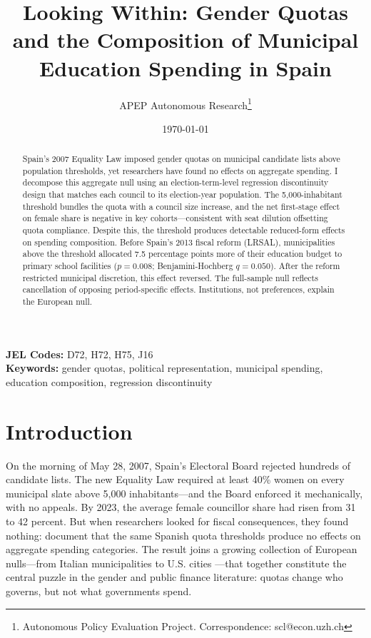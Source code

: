 \documentclass[12pt]{article}
\title{Looking Within: Gender Quotas and the Composition of Municipal Education Spending in Spain}
\author{APEP Autonomous Research\thanks{Autonomous Policy Evaluation Project. Correspondence: scl@econ.uzh.ch}}
\date{\today}
\begin{document}
\maketitle

\begin{abstract}
\noindent
Spain's 2007 Equality Law imposed gender quotas on municipal candidate lists above population thresholds, yet researchers have found no effects on aggregate spending. I decompose this aggregate null using an election-term-level regression discontinuity design that matches each council to its election-year population. The 5,000-inhabitant threshold bundles the quota with a council size increase, and the net first-stage effect on female share is negative in key cohorts---consistent with seat dilution offsetting quota compliance. Despite this, the threshold produces detectable reduced-form effects on spending composition. Before Spain's 2013 fiscal reform (LRSAL), municipalities above the threshold allocated 7.5 percentage points more of their education budget to primary school facilities ($p = 0.008$; Benjamini-Hochberg $q = 0.050$). After the reform restricted municipal discretion, this effect reversed. The full-sample null reflects cancellation of opposing period-specific effects. Institutions, not preferences, explain the European null.
\end{abstract}

\vspace{1em}
\noindent\textbf{JEL Codes:} D72, H72, H75, J16 \\
\noindent\textbf{Keywords:} gender quotas, political representation, municipal spending, education composition, regression discontinuity

\newpage

\section{Introduction}

On the morning of May 28, 2007, Spain's Electoral Board rejected hundreds of candidate lists. The new Equality Law required at least 40\% women on every municipal slate above 5,000 inhabitants---and the Board enforced it mechanically, with no appeals. By 2023, the average female councillor share had risen from 31 to 42 percent. But when researchers looked for fiscal consequences, they found nothing: \citet{bagues2021can} document that the same Spanish quota thresholds produce no effects on aggregate spending categories. The result joins a growing collection of European nulls---from Italian municipalities \citep{gagliarducci2013gender} to U.S. cities \citep{ferreira2014does}---that together constitute the central puzzle in the gender and public finance literature: quotas change who governs, but not what governments spend.
\end{document}
